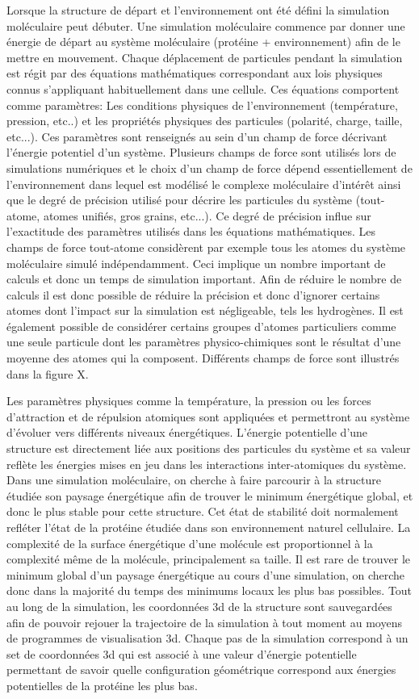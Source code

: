 Lorsque la structure de départ et l'environnement ont été défini la simulation moléculaire peut débuter. Une simulation moléculaire commence par donner une énergie de départ au système moléculaire (protéine + environnement) afin de le mettre en mouvement. Chaque déplacement de particules pendant la simulation est régit par des équations mathématiques correspondant aux lois physiques connus s'appliquant habituellement dans une cellule. Ces équations comportent comme paramètres: Les conditions physiques de l'environnement (température, pression, etc..) et les propriétés physiques des particules (polarité, charge, taille, etc...). Ces paramètres sont renseignés au sein d'un champ de force décrivant l'énergie potentiel d'un système. Plusieurs champs de force sont utilisés lors de simulations numériques et le choix d'un champ de force dépend essentiellement de l'environnement dans lequel est modélisé le complexe moléculaire d'intérêt ainsi que le degré de précision utilisé pour décrire les particules du système (tout-atome, atomes unifiés, gros grains, etc...). Ce degré de précision influe sur l'exactitude des paramètres utilisés dans les équations mathématiques. Les champs de force tout-atome considèrent par exemple tous les atomes du système moléculaire simulé indépendamment. Ceci implique un nombre important de calculs et donc un temps de simulation important. Afin de réduire le nombre de calculs il est donc possible de réduire la précision et donc d'ignorer certains atomes dont l'impact sur la simulation est négligeable, tels les hydrogènes. Il est également possible de considérer certains groupes d'atomes particuliers comme une seule particule dont les paramètres physico-chimiques sont le résultat d'une moyenne des atomes qui la composent. Différents champs de force sont illustrés dans la figure X.

Les paramètres physiques comme la température, la pression ou les forces d'attraction et de répulsion atomiques sont appliquées et permettront au système d'évoluer vers différents niveaux énergétiques. L'énergie potentielle d'une structure est directement liée aux positions des particules du système et sa valeur reflète les énergies mises en jeu dans les interactions inter-atomiques du système. Dans une simulation moléculaire, on cherche à faire parcourir à la structure étudiée son paysage énergétique afin de trouver le minimum énergétique global, et donc le plus stable pour cette structure. Cet état de stabilité doit normalement refléter l'état de la protéine étudiée dans son environnement naturel cellulaire. La complexité de la surface énergétique d'une molécule est proportionnel à la complexité même de la molécule, principalement sa taille. Il est rare de trouver le minimum global d'un paysage énergétique au cours d'une simulation, on cherche donc dans la majorité du temps des minimums locaux les plus bas possibles. Tout au long de la simulation, les coordonnées 3d de la structure sont sauvegardées afin de pouvoir rejouer la trajectoire de la simulation à tout moment au moyens de programmes de visualisation 3d. Chaque pas de la simulation correspond à un set de coordonnées 3d qui est associé à une valeur d'énergie potentielle permettant de savoir quelle configuration géométrique correspond aux énergies potentielles de la protéine les plus bas.

